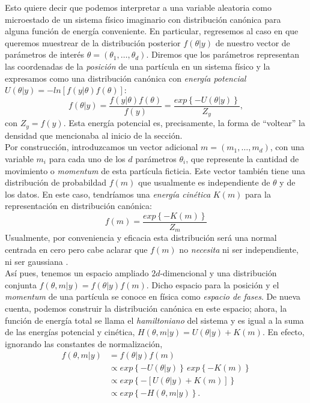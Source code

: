  Esto quiere decir que podemos interpretar a una variable aleatoria como microestado de un sistema físico imaginario con distribución canónica para alguna función de energía conveniente. En particular, regresemos al caso en que queremos muestrear de la distribución posterior $f(\theta|y)$ de nuestro vector de parámetros de interés $\theta = (\theta_1,\dots,\theta_d)$. Diremos que los parámetros representan las coordenadas de la \textit{posición} de una partícula en un sistema físico y la expresamos como una distribución canónica con \textit{energía potencial} $U(\theta|y) = -ln\left[f(y|\theta)f(\theta)\right]$: 
\begin{equation*}
 f(\theta|y)=\dfrac{f(y|\theta)f(\theta)}{f(y)}=\dfrac{exp\left\lbrace -U(\theta|y)\right\rbrace}{Z_y},
\end{equation*} 
con $Z_y = f(y)$. Esta energía potencial es, precisamente, la forma de ``voltear'' la densidad que mencionaba al inicio de la sección.\\
 
 Por construcción, introduzcamos un vector adicional $m = (m_1,\dots,m_d)$, con una variable $m_i$ para cada uno de los $d$ parámetros $\theta_i$, que represente la cantidad de movimiento o \textit{momentum} de esta partícula ficticia. Este vector también tiene una distribución de probabildad $f(m)$ que usualmente es independiente de $\theta$ y de los datos. En este caso, tendríamos una \textit{energía cinética} $K(m)$ para la representación en distribución canónica: 
 \begin{equation*}
f(m)=\dfrac{exp\left\lbrace -K(m)\right\rbrace}{Z_m}
 \end{equation*} 
 Usualmente, por conveniencia y eficacia esta distribución será una normal centrada en cero pero cabe aclarar que $f(m)$ no \textit{necesita} ni ser independiente, ni ser gaussiana \parencite{Betancourt17}.\\
 
 Así pues, tenemos un espacio ampliado $2d$-dimencional y una distribución conjunta $f(\theta,m|y)=f(\theta|y)f(m)$. Dicho espacio para la posición y el \textit{momentum} de una partícula se conoce en física como \textit{espacio de fases}. De nueva cuenta, podemos construir la distribución canónica en este espacio; ahora, la función de energía total se llama el \textit{hamiltoniano} del sistema y es igual a la suma de las energías potencial y cinética, $H(\theta,m|y) = U(\theta|y) + K(m)$. En efecto, ignorando las constantes de normalización, 
 \begin{align*}
 f(\theta,m|y)&=f(\theta|y)f(m)\\
 &\propto exp\left\lbrace -U(\theta|y)\right\rbrace \, exp\left\lbrace -K(m)\right\rbrace\\
 &\propto exp\left\lbrace -\left[ U(\theta|y) + K(m)\right]\right\rbrace\\
 &\propto exp\left\lbrace -H(\theta,m|y)\right\rbrace.
 \end{align*}
 
